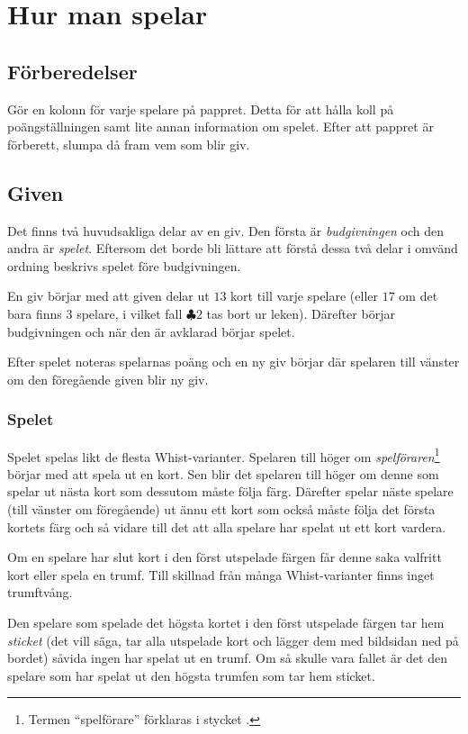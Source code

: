 \documentclass[a4paper]{article}
\begin{document}
	\section{Hur man spelar}{%
		\subsection{Förberedelser}{%
			Gör en kolonn för varje spelare på pappret. Detta för att hålla koll på poängställningen samt lite annan information om spelet. Efter att pappret är förberett, slumpa då fram vem som blir giv.
		}

		\subsection{Given}{%
			Det finns två huvudsakliga delar av en giv. Den första är \emph{budgivningen} och den andra är \emph{spelet}. Eftersom det borde bli lättare att förstå dessa två delar i omvänd ordning beskrivs spelet före budgivningen.

			En giv börjar med att given delar ut $13$ kort till varje spelare (eller $17$ om det bara finns $3$ spelare, i vilket fall $\clubsuit 2$ tas bort ur leken). Därefter börjar budgivningen och när den är avklarad börjar spelet.

			Efter spelet noteras spelarnas poäng och en ny giv börjar där spelaren till vänster om den föregående given blir ny giv.

			\subsubsection{Spelet}{%
				Spelet spelas likt de flesta Whist-varianter. Spelaren till höger om \emph{spelföraren}\footnote{Termen ``spelförare'' förklaras i stycket \textit{}.} börjar med att spela ut en kort. Sen blir det spelaren till höger om denne som spelar ut nästa kort som dessutom måste följa färg. Därefter spelar näste spelare (till vänster om föregående) ut ännu ett kort som också måste följa det första kortets färg och så vidare till det att alla spelare har spelat ut ett kort vardera.

				Om en spelare har slut kort i den först utspelade färgen får denne saka valfritt kort eller spela en trumf. Till skillnad från många Whist-varianter finns inget trumftvång.

				Den spelare som spelade det högsta kortet i den först utspelade färgen tar hem \emph{sticket} (det vill säga, tar alla utspelade kort och lägger dem med bildsidan ned på bordet) såvida ingen har spelat ut en trumf. Om så skulle vara fallet är det den spelare som har spelat ut den högsta trumfen som tar hem sticket.

}}}
\end{document}
